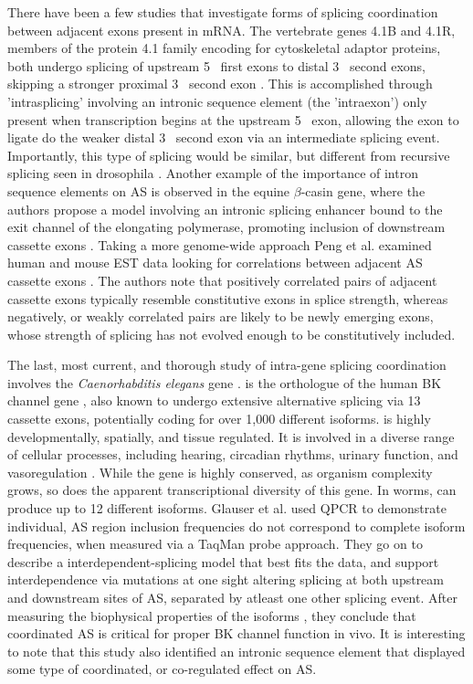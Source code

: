 There have been a few studies that investigate forms of splicing coordination between adjacent exons present in mRNA. The vertebrate genes 4.1B and 4.1R, members of the protein 4.1 family encoding for cytoskeletal adaptor proteins, both undergo splicing of upstream 5\textprime~ first exons to distal 3\textprime~ second exons, skipping a stronger proximal 3\textprime~ second exon \citep{Parra2008, Parra2012}. This is accomplished through 'intrasplicing' involving an intronic sequence element (the 'intraexon') only present when transcription begins at the upstream 5\textprime~ exon, allowing the exon to ligate do the weaker distal 3\textprime~ second exon via an intermediate splicing event. Importantly, this type of splicing would be similar, but different from recursive splicing seen in drosophila \citep{Burnette2005}. Another example of the importance of intron sequence elements on AS is observed in the equine $\beta$-casin gene, where the authors propose a model involving an intronic splicing enhancer bound to the exit channel of the elongating polymerase, promoting inclusion of downstream cassette exons \citep{Lenasi2006}. Taking a more genome-wide approach Peng et al. examined human and mouse EST data looking for correlations between adjacent AS cassette exons \citep{Peng2008}. The authors note that positively correlated pairs of adjacent cassette exons typically resemble constitutive exons in splice strength, whereas negatively, or weakly correlated pairs are likely to be newly emerging exons, whose strength of splicing has not evolved enough to be constitutively included. 

The last, most current, and thorough study of intra-gene splicing coordination involves the \textit{Caenorhabditis elegans} gene \slo{} \citep{Glauser2011, Johnson2011}. \slo{} is the  orthologue of the human BK channel gene \kcnma{}, also known to undergo extensive alternative splicing \citep{Nilsen2010} via 13 cassette exons, potentially coding for over 1,000 different isoforms. \kcnma{} is highly developmentally, spatially, and tissue regulated. It is involved in a diverse range of cellular processes, including hearing, circadian rhythms, urinary function, and vasoregulation \citep{Fodor2009a}. While the gene is highly conserved, as organism complexity grows, so does the apparent transcriptional diversity of this gene. In worms, \slo{} can produce up to 12 different isoforms. Glauser et al. used QPCR to demonstrate individual, AS region inclusion frequencies do not correspond to complete isoform frequencies, when measured via a TaqMan probe approach. They go on to describe a interdependent-splicing model that best fits the data, and support interdependence via mutations at one sight altering splicing at both upstream and downstream sites of AS, separated by atleast one other splicing event. After measuring the biophysical properties of the isoforms \citep{Johnson2011}, they conclude that coordinated AS is critical for proper BK channel function in vivo. It is interesting to note that this study also identified an intronic sequence element that displayed some type of coordinated, or co-regulated effect on AS. 

